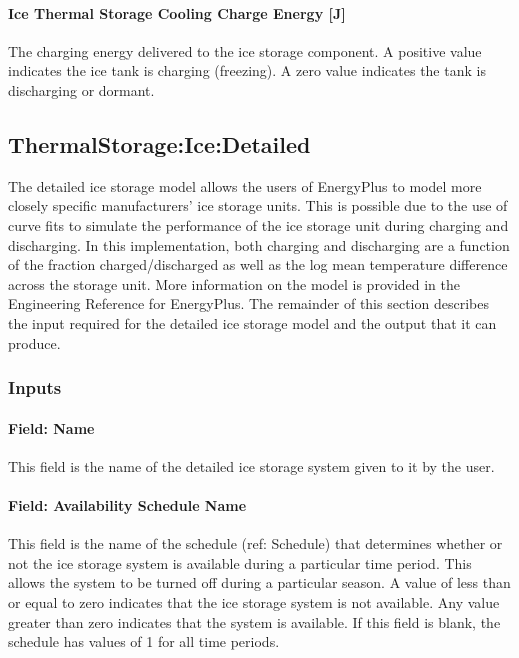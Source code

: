 \paragraph{Ice Thermal Storage Cooling Charge Energy {[}J{]}}\label{ice-thermal-storage-cooling-charge-energy-j}

The charging energy delivered to the ice storage component. A positive value indicates the ice tank is charging (freezing). A zero value indicates the tank is discharging or dormant.

\subsection{ThermalStorage:Ice:Detailed}\label{thermalstorageicedetailed}

The detailed ice storage model allows the users of EnergyPlus to model more closely specific manufacturers' ice storage units. This is possible due to the use of curve fits to simulate the performance of the ice storage unit during charging and discharging. In this implementation, both charging and discharging are a function of the fraction charged/discharged as well as the log mean temperature difference across the storage unit. More information on the model is provided in the Engineering Reference for EnergyPlus. The remainder of this section describes the input required for the detailed ice storage model and the output that it can produce.

\subsubsection{Inputs}\label{inputs-21-004}

\paragraph{Field: Name}\label{field-name-21-001}

This field is the name of the detailed ice storage system given to it by the user.

\paragraph{Field: Availability Schedule Name}\label{field-availability-schedule-name-012}

This field is the name of the schedule (ref: Schedule) that determines whether or not the ice storage system is available during a particular time period. This allows the system to be turned off during a particular season. A value of less than or equal to zero indicates that the ice storage system is not available. Any value greater than zero indicates that the system is available. If this field is blank, the schedule has values of 1 for all time periods.

